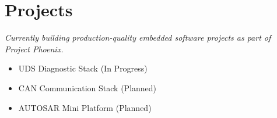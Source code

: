 \section{Projects}

\textit{Currently building production-quality embedded software projects as part of Project Phoenix.}

\begin{itemize}
    \item UDS Diagnostic Stack (In Progress)
    \item CAN Communication Stack (Planned)
    \item AUTOSAR Mini Platform (Planned)
\end{itemize}